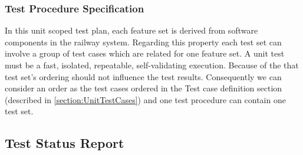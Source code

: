 \noindent\subsubsection{Test Procedure Specification}
In this unit scoped test plan, each feature set is derived from software components in the railway system. Regarding this property each test set can involve a group of test cases which are related for one feature set. A unit test must be a fast, isolated, repeatable, self-validating execution. Because of the that test set's ordering should not influence the test results. Consequently we can consider an order as the test cases ordered in the Test case definition section (described in \autoref{section:UnitTestCases}) and one test procedure can contain one test set. 


\subsection{Test Status Report}



